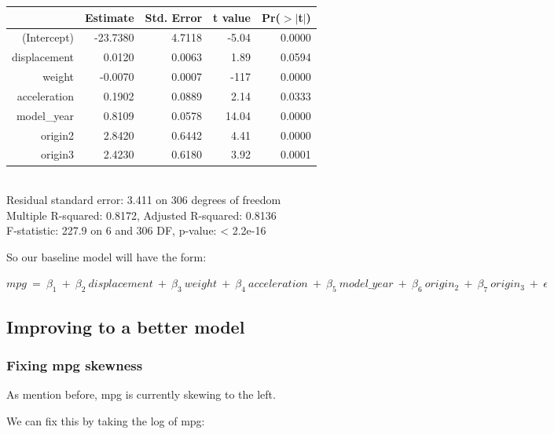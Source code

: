 \begin{table}[H]
\centering
{}
\begin{tabular}{rrrrr}
  \hline
 & Estimate & Std. Error & t value & Pr($>$$|$t$|$) \\ 
  \hline
(Intercept) & -23.7380 & 4.7118 & -5.04 & 0.0000 \\ 
  displacement & 0.0120 & 0.0063 & 1.89 & 0.0594 \\ 
  weight & -0.0070 & 0.0007 & -117 & 0.0000 \\ 
  acceleration & 0.1902 & 0.0889 & 2.14 & 0.0333 \\ 
  model\_year & 0.8109 & 0.0578 & 14.04 & 0.0000 \\ 
  origin2 & 2.8420 & 0.6442 & 4.41 & 0.0000 \\ 
  origin3 & 2.4230 & 0.6180 & 3.92 & 0.0001 \\ 
   \hline
\end{tabular}
\\[0.5cm]
Residual standard error: 3.411 on 306 degrees of freedom
\\
Multiple R-squared:  0.8172,	Adjusted R-squared:  0.8136 
\\
F-statistic: 227.9 on 6 and 306 DF,  p-value: < 2.2e-16
\end{table}

So our baseline model will have the form:

\begin{center}
$mpg \ = \ \beta_1 \ + \ \beta_2 \ displacement \ + \ \beta_3 \ weight \ + \ \beta_4 \ acceleration \ + \ \beta_5 \ model\_year \ + \ \beta_6 \ origin_2 \ + \ \beta_7 \ origin_3 \ + \ \epsilon$
\end{center}

\subsection{Improving to a better model}
\subsubsection{Fixing mpg skewness}

As mention before, mpg is currently skewing to the left.

We can fix this by taking the log of mpg:

